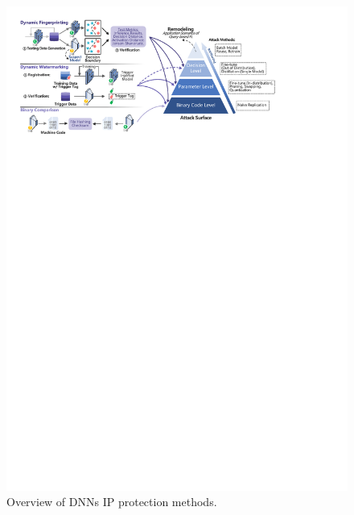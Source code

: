 \documentclass[journal]{IEEEtran}
\begin{document}
\begin{figure}[t]
  \centering
  \includegraphics[scale=1]{fig/ip_protection.pdf}
  \caption{Overview of DNNs IP protection methods.}
  \label{fig:ip}
\end{figure}
\end{document}
